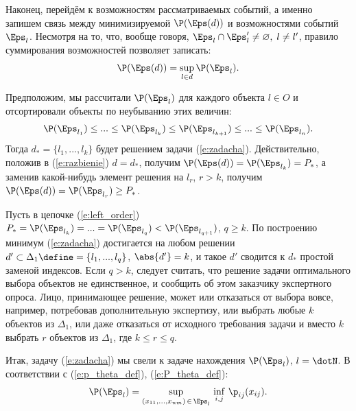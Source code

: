Наконец, перейдём к возможностям рассматриваемых событий, а именно запишем связь между минимизируемой $\P(\Eps(d))$ и возможностями событий $\Eps_l$. Несмотря на то, что, вообще говоря, $\Eps_l \cap \Eps_l' \neq \varnothing,\; l \neq l'$, правило суммирования возможностей позволяет записать:
\begin{equation}
  \label{e:razbienie}
  \P(\Eps(d)) = \sup_{l \in d} \P(\Eps_l).
\end{equation}

Предположим, мы рассчитали  $\P(\Eps_l)$ для каждого объекта $l \in O$ и отсортировали объекты по неубыванию этих величин:
\begin{equation}
  \label{e:left_order}
  \P(\Eps_{l_1}) \leq ... \leq \P(\Eps_{l_k}) \leq \P(\Eps_{l_{k+1}}) \leq ... \leq \P(\Eps_{l_n}). 
\end{equation}
Тогда $d_* = \{l_1, ...,  l_k\}$ будет решением задачи (\ref{e:zadacha}). Действительно, положив в (\ref{e:razbienie}) $d = d_*$, получим $\P(\Eps(d)) = \P(\Eps_{l_k}) = P_*$, а заменив какой-нибудь элемент  решения на $l_r$, $r > k$, получим $\P(\Eps(d)) = \P(\Eps_{l_r}) \geq P_*$. 

\vspace*{1ex}  \noticeheader
\begin{notice}
Пусть в цепочке (\ref{e:left_order}) $P_* = \P(\Eps_{l_k}) = ... = \P(\Eps_{l_q}) < \P(\Eps_{l_{q+1}})$, $q \geq k$. По построению минимум (\ref{e:zadacha}) достигается на любом решении $d' \subset \Delta_1 \define= \{l_1, ..., l_q\}$, $\abs{d'} = k$, и такое $d'$ сводится к $d_*$ простой заменой индексов. Если $q > k$, следует считать, что решение задачи оптимального выбора объектов не единственное, и сообщить об этом заказчику экспертного опроса. Лицо, принимающее решение, может или отказаться от выбора вовсе, например, потребовав дополнительную экспертизу, или выбрать любые $k$ объектов из $\Delta_1$, или даже отказаться от исходного требования задачи и вместо $k$ выбрать $r$ объектов из $\Delta_1$, где $k \leq r \leq q$.
\end{notice}

 Итак, задачу (\ref{e:zadacha}) мы свели к задаче нахождения $\P(\Eps_l)$, $l = \dotN$. В соответствии с (\ref{e:p_theta_def}), (\ref{e:P_theta_def}):
\begin{equation}
  \label{e:pl_main}
  \P(\Eps_l) = \sup_{(x_{11}, ..., x_{nm})\,\in\,\Eps_l} \, \inf_{i, j}\,\p_{ij}(x_{ij}). 
\end{equation}

